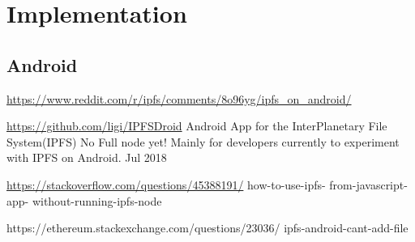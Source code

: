 \section{Implementation}\label{seImplementation}

\subsection{Android}

\url{https://www.reddit.com/r/ipfs/comments/8o96yg/ipfs_on_android/}

\url{https://github.com/ligi/IPFSDroid} Android App for the
InterPlanetary File System(IPFS) No Full node yet! Mainly for
developers currently to experiment with IPFS on Android. Jul 2018

\url{https://stackoverflow.com/questions/45388191/}
how-to-use-ipfs- from-javascript-app- without-running-ipfs-node

https://ethereum.stackexchange.com/questions/23036/ ipfs-android-cant-add-file
